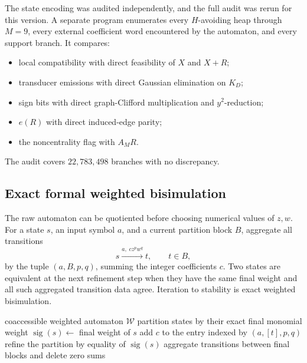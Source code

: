 \documentclass[10pt,letterpaper]{article}
\begin{document}
The state encoding was audited independently, and the full audit was rerun for this version. A separate program enumerates every \(H\)-avoiding heap through \(M=9\), every external coefficient word encountered by the automaton, and every support branch.  It compares:
\begin{itemize}
\item local compatibility with direct feasibility of \(X\) and \(X+R\);
\item transducer emissions with direct Gaussian elimination on \(K_D\);
\item sign bits with direct graph-Clifford multiplication and \(y^2\)-reduction;
\item \(e(R)\) with direct induced-edge parity;
\item the noncentrality flag with \(A_MR\).
\end{itemize}
The audit covers \(22{,}783{,}498\) branches with no discrepancy.

\subsection{Exact formal weighted bisimulation}

The raw automaton can be quotiented before choosing numerical values of \(z,w\).  For a state \(s\), an input symbol \(a\), and a current partition block \(B\), aggregate all transitions
\[
 s\xrightarrow{a,\;c z^pw^q}t,
 \qquad t\in B,
\]
by the tuple \((a,B,p,q)\), summing the integer coefficients \(c\).  Two states are equivalent at the next refinement step when they have the same final weight and all such aggregated transition data agree.  Iteration to stability is exact weighted bisimulation.

\begin{algorithm}[t]
\caption{Exact formal bisimulation quotient}\label{alg:bisimulation}
\begin{algorithmic}[1]
\Require coaccessible weighted automaton \(\mathcal W\)
\State partition states by their exact final monomial weight
\Repeat
    \State \(\operatorname{sig}(s)\gets\) final weight of \(s\)
        \State add \(c\) to the entry indexed by \((a,[t],p,q)\)
      \EndFor
    \EndFor
  \EndFor
  \State refine the partition by equality of \(\operatorname{sig}(s)\)
\State aggregate transitions between final blocks and delete zero sums
\end{algorithmic}
\end{algorithm}
\end{document}
